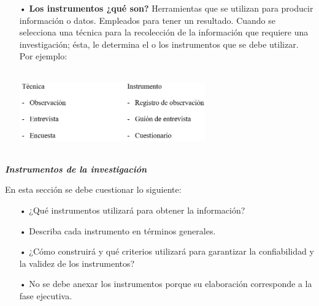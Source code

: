 \documentclass[12pt, a4paper, nofontenc, numbers=endperiod]{apa7}
\begin{document}
{{\begin{itemize}[leftmargin=2.90cm]
\begin{itemize}[leftmargin=0.5cm]
	\item[o] Dar contestación a las preguntas directrices.
	\item[o] Conseguir los objetivos específicos del proyecto.
	\item[o]	Fundamentalmente elaborar el diagnóstico de la necesidad de elaborar la propuesta.
\end{itemize}

\item[•]  \textbf{Los instrumentos ¿qué son? } Herramientas que se utilizan para producir información o datos. Empleados para tener un resultado. Cuando se selecciona una técnica para la recolección de la información que requiere una investigación; ésta, le determina el o los instrumentos que se debe utilizar. Por ejemplo:

\begin{center}
	\includegraphics[width=8cm,height=3.5cm]{Imagenes/Figura40}
\end{center}


\end{itemize}
}
\setlength{\parindent}{2.5cm}\textit{\textbf{Instrumentos de la investigación}}
	
\setlength{\parindent}{2.5cm}En esta sección se debe cuestionar lo siguiente:
{\doublespacing
\begin{itemize}[leftmargin=2.90cm]
	\item[•] ¿Qué instrumentos utilizará para obtener la información?
	\item[•] Describa cada instrumento en términos generales.
	\item[•] ¿Cómo construirá y qué criterios utilizará para garantizar la confiabilidad y la validez de los instrumentos?
	\item[•] No se debe anexar los instrumentos porque su elaboración corresponde a la fase ejecutiva.
	

\end{itemize}}}
\end{document}
